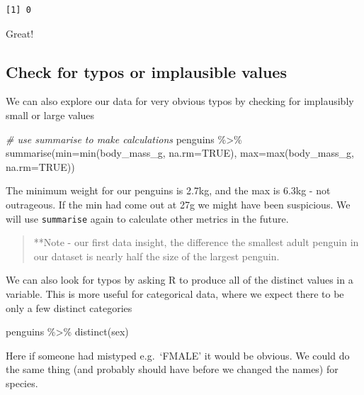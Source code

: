 \documentclass[
]{book}
\newenvironment{Shaded}{\begin{snugshade}}{\end{snugshade}}
\newcommand{\AttributeTok}[1]{\textcolor[rgb]{0.77,0.63,0.00}{#1}}
\newcommand{\CommentTok}[1]{\textcolor[rgb]{0.56,0.35,0.01}{\textit{#1}}}
\newcommand{\ConstantTok}[1]{\textcolor[rgb]{0.00,0.00,0.00}{#1}}
\newcommand{\FunctionTok}[1]{\textcolor[rgb]{0.00,0.00,0.00}{#1}}
\newcommand{\NormalTok}[1]{#1}
\newcommand{\SpecialCharTok}[1]{\textcolor[rgb]{0.00,0.00,0.00}{#1}}
\begin{document}
\begin{verbatim}
[1] 0
\end{verbatim}

Great!

\hypertarget{check-for-typos-or-implausible-values}{%
\subsection{Check for typos or implausible values}\label{check-for-typos-or-implausible-values}}

We can also explore our data for very obvious typos by checking for implausibly small or large values

\begin{Shaded}
\begin{Highlighting}[]
\CommentTok{\# use summarise to make calculations}
\NormalTok{penguins }\SpecialCharTok{\%\textgreater{}\%} 
  \FunctionTok{summarise}\NormalTok{(}\AttributeTok{min=}\FunctionTok{min}\NormalTok{(body\_mass\_g, }\AttributeTok{na.rm=}\ConstantTok{TRUE}\NormalTok{), }
            \AttributeTok{max=}\FunctionTok{max}\NormalTok{(body\_mass\_g, }\AttributeTok{na.rm=}\ConstantTok{TRUE}\NormalTok{))}
\end{Highlighting}
\end{Shaded}

The minimum weight for our penguins is 2.7kg, and the max is 6.3kg - not outrageous. If the min had come out at 27g we might have been suspicious. We will use \texttt{summarise} again to calculate other metrics in the future.

\begin{quote}
**Note - our first data insight, the difference the smallest adult penguin in our dataset is nearly half the size of the largest penguin.
\end{quote}

We can also look for typos by asking R to produce all of the distinct values in a variable. This is more useful for categorical data, where we expect there to be only a few distinct categories

\begin{Shaded}
\begin{Highlighting}[]
\NormalTok{penguins }\SpecialCharTok{\%\textgreater{}\%} 
  \FunctionTok{distinct}\NormalTok{(sex)}
\end{Highlighting}
\end{Shaded}

Here if someone had mistyped e.g.~`FMALE' it would be obvious. We could do the same thing (and probably should have before we changed the names) for species.
\end{document}
